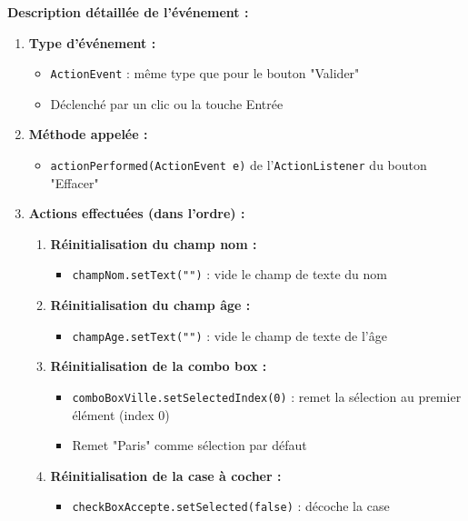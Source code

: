 \documentclass[11pt,a4paper]{article}
\begin{document}
\begin{correctionbox}
\textbf{Description détaillée de l'événement :}

\begin{enumerate}
    \item \textbf{Type d'événement :}
    \begin{itemize}
        \item \texttt{ActionEvent} : même type que pour le bouton "Valider"
        \item Déclenché par un clic ou la touche Entrée
    \end{itemize}
    
    \item \textbf{Méthode appelée :}
    \begin{itemize}
        \item \texttt{actionPerformed(ActionEvent e)} de l'\texttt{ActionListener} du bouton "Effacer"
    \end{itemize}
    
    \item \textbf{Actions effectuées (dans l'ordre) :}
    \begin{enumerate}
        \item \textbf{Réinitialisation du champ nom :}
        \begin{itemize}
            \item \texttt{champNom.setText("")} : vide le champ de texte du nom
        \end{itemize}
        
        \item \textbf{Réinitialisation du champ âge :}
        \begin{itemize}
            \item \texttt{champAge.setText("")} : vide le champ de texte de l'âge
        \end{itemize}
        
        \item \textbf{Réinitialisation de la combo box :}
        \begin{itemize}
            \item \texttt{comboBoxVille.setSelectedIndex(0)} : remet la sélection au premier élément (index 0)
            \item Remet "Paris" comme sélection par défaut
        \end{itemize}
        
        \item \textbf{Réinitialisation de la case à cocher :}
        \begin{itemize}
            \item \texttt{checkBoxAccepte.setSelected(false)} : décoche la case
        \end{itemize}
        

\end{enumerate}
\end{enumerate}
\end{correctionbox}
\end{document}
